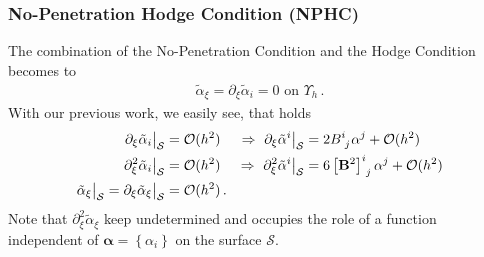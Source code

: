 \documentclass[a4paper,10pt]{scrartcl}
\newcommand{\surf}{\mathcal{S}}
\newcommand{\landau}{\mathcal{O}}
\newcommand{\Bb}{\mathbf{B}}
\newcommand{\alphab}{\bm{\alpha}}
\newcommand{\talpha}{\tilde{\alpha}}
\newcommand{\boundary}[1]{\Upsilon_{h}^{#1}}
\newcommand{\AtSurface}{\big|_{\surf}}
\newcommand{\formPeriod}{\,\text{.}}
\begin{document}
    \subsubsection{No-Penetration Hodge Condition (NPHC)}
      The combination of the No-Penetration Condition and the Hodge Condition becomes to
      \begin{align}
        \talpha_{\xi} = \partial_{\xi}\talpha_{i} = 0 \text{ on }\boundary{} \formPeriod
      \end{align}
      With our previous work, we easily see, that holds
      \begin{align}
        \partial_{\xi}\talpha_{i}\AtSurface &= \landau(h^{2})
                &\Rightarrow\ \partial_{\xi}\talpha^{i}\AtSurface &= 2\tensor{B}{^{i}_{j}}\alpha^{j} + \landau(h^{2}) \\
        \partial_{\xi}^{2}\talpha_{i}\AtSurface &= \landau(h^{2})
                &\Rightarrow\ \partial_{\xi}^{2}\talpha^{i}\AtSurface &= 6\tensor{\left[\Bb^{2}\right]}{^{i}_{j}}\alpha^{j} + \landau(h^{2}) \\
        \talpha_{\xi}\AtSurface = \partial_{\xi}\talpha_{\xi}\AtSurface &= \landau(h^{2}) \formPeriod
      \end{align}
      Note that \( \partial_{\xi}^{2}\talpha_{\xi} \) keep undetermined and occupies the role of a function independent of \( \alphab =\left\{ \alpha_{i} \right\} \) on the surface \( \surf \).
\end{document}
